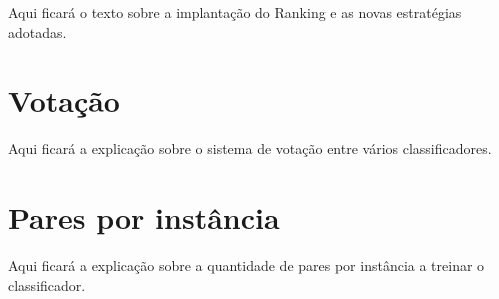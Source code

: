 Aqui ficará o texto sobre a implantação do Ranking e as novas estratégias adotadas.

\section{Votação}
Aqui ficará a explicação sobre o sistema de votação entre vários classificadores.

\section{Pares por instância}
Aqui ficará a explicação sobre a quantidade de pares por instância a treinar o classificador.
